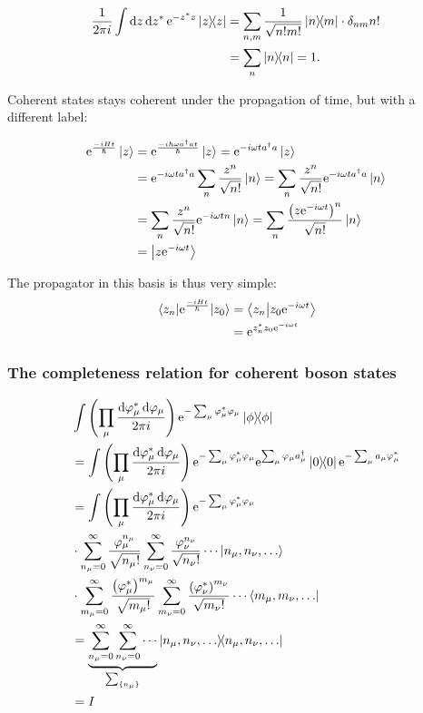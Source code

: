 \begin{align*}
\frac{1}{2\pi i}\int\dd z \dd{z^*}\e^{-z^*z}\dyad z &= \sum_{n, m}\frac{1}{\sqrt{n!m!}}\dyad{n}{m}\cdot \delta_{nm}n! \\
&= \sum_{n}\dyad{n} = 1.
\end{align*}

Coherent states stays coherent under the propagation of time, but with a different label:

\begin{align*}
\mathrm{e}^{\frac{-iHt}{\hbar}}\ket z &= \mathrm{e}^{\frac{-i\hbar\omega a^\dagger at}{\hbar}}\ket z = \mathrm{e}^{-i\omega ta^\dagger a}\ket z \\
&= \mathrm{e}^{-i\omega ta^\dagger a}\sum_n\frac{z^n}{\sqrt{n!}}\ket n = \sum_n\frac{z^n}{\sqrt{n!}}\mathrm{e}^{-i\omega ta^\dagger a}\ket n \\
&=  \sum_n\frac{z^n}{\sqrt{n!}}\mathrm{e}^{-i\omega tn}\ket n = \sum_n\frac{\left(z\mathrm{e}^{-i\omega t}\right)^n}{\sqrt{n!}}\ket n \\
&= \ket{z\mathrm{e}^{-i\omega t}}
\end{align*}

The propagator in this basis is thus very simple:
\begin{align}
\mel{z_n}{\mathrm{e}^{\frac{-iHt}{\hbar}}}{z_0} &= \braket{z_n}{z_0\mathrm{e}^{-i\omega t}} \\
&= \mathrm{e}^{z_n^*z_0\mathrm{e}^{-i\omega t}}
\end{align}

\subsubsection{The completeness relation for coherent boson states}

\begin{align*}
&\int\left(\prod_\mu\frac{\dd{\varphi_\mu^*}\dd{\varphi_\mu}}{2\pi i}\right)\e^{-\sum_\mu\varphi_\mu^*\varphi_\mu}\dyad{\phi}  \\
&= \int\left(\prod_\mu\frac{\dd{\varphi_\mu^*}\dd{\varphi_\mu}}{2\pi i}\right)\e^{-\sum_\mu\varphi_\mu^*\varphi_\mu}\e^{\sum_\mu\varphi_\mu a_\mu^\dagger}\dyad 0 \e^{-\sum_\mu a_\mu\varphi_\mu^*} \\
&=\int\left(\prod_\mu\frac{\dd{\varphi_\mu^*}\dd{\varphi_\mu}}{2\pi i}\right)\e^{-\sum_\mu\varphi_\mu^*\varphi_\mu} \\
&\cdot \sum_{n_{\mu}=0}^\infty\frac{\varphi_\mu^{n_\mu}}{\sqrt{n_\mu!}}\sum_{n_{\nu}=0}^\infty\frac{\varphi_\nu^{n_\nu}}{\sqrt{n_\nu!}}\cdots\ket{n_\mu, n_\nu, \dots}\\
&\cdot \sum_{m_{\mu}=0}^\infty\frac{\left(\varphi_\mu^*\right)^{m_\mu}}{\sqrt{m_\mu!}}\sum_{m_{\nu}=0}^\infty\frac{\left(\varphi_\nu^*\right)^{m_\nu}}{\sqrt{m_\nu!}}\cdots \bra{m_\mu, m_\nu, \dots} \\
&= \underbrace{\sum_{n_\mu = 0}^\infty\sum_{n_\nu = 0}^\infty\cdots}_{\sum_{\{n_\mu\}}} \dyad{n_\mu, n_\nu, \dots} \\
&= I
\end{align*}


